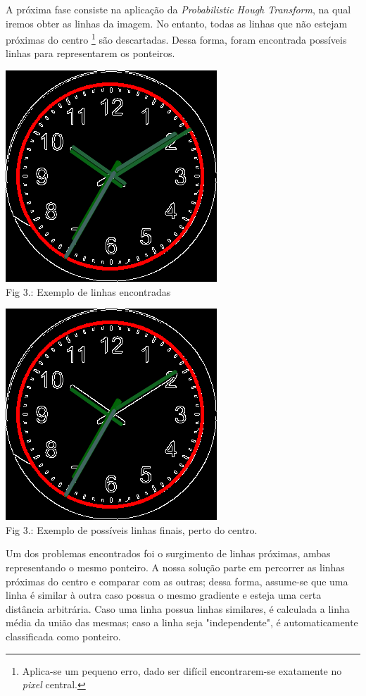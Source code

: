 \documentclass[a4paper]{article}
\begin{document}
A próxima fase consiste na aplicação da \textit{Probabilistic Hough Transform}, na qual iremos obter as linhas da imagem. No entanto, todas as linhas que não estejam próximas do centro \footnote{Aplica-se um pequeno erro, dado ser difícil encontrarem-se exatamente no \textit{pixel} central.} são descartadas. Dessa forma, foram encontrada possíveis linhas para representarem os ponteiros.

\begin{center}
    \includegraphics[scale=0.5]{detected_lines.png}
    \\ Fig 3.: Exemplo de linhas encontradas
\end{center}
\vfill
\begin{center}
    \includegraphics[scale=0.5]{possible_lines.png}
    \\ Fig 3.: Exemplo de possíveis linhas finais, perto do centro.
\end{center}

Um dos problemas encontrados foi o surgimento de linhas próximas, ambas representando o mesmo ponteiro. A nossa solução parte em percorrer as linhas próximas do centro e comparar com as outras; dessa forma, assume-se que uma linha é similar à outra caso possua o mesmo gradiente e esteja uma certa distância arbitrária. Caso uma linha possua linhas similares, é calculada a linha média da união das mesmas; caso a linha seja "independente", é automaticamente classificada como ponteiro.
\end{document}
